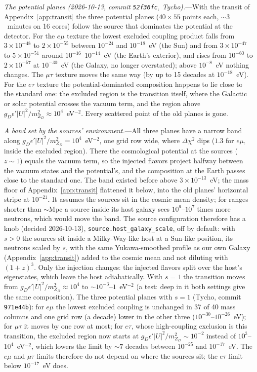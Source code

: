 \documentclass[11pt,a4paper]{article}
\newcommand{\mzd}{m_{Z_D}}
\newcommand{\gd}{g_D}
\newcommand{\epsp}{\epsilon'}
\begin{document}
\textit{The potential planes (2026-10-13, commit \texttt{52f36fc}, Tycho).}---With the transit
of Appendix~\ref{app:transit} the three potential planes ($40\times55$ points each, $\sim3$~minutes on
16 cores) follow the source that dominates the potential at the detector. For the $e\mu$ texture
the lowest excluded coupling product falls from $3\times10^{-48}$ to $2\times10^{-55}$ between
$10^{-24}$ and $10^{-18}$~eV (the Sun) and from $3\times10^{-47}$ to $5\times10^{-51}$ around
$10^{-16}$--$10^{-14}$~eV (the Earth's exterior), and rises from $10^{-60}$ to $2\times10^{-57}$ at
$10^{-30}$~eV (the Galaxy, no longer overstated); above $10^{-8}$~eV nothing changes. The $\mu\tau$
texture moves the same way (by up to 15 decades at $10^{-18}$~eV). For the $e\tau$ texture the
potential-dominated composition happens to lie close to the standard one: the excluded region is
the transition itself, where the Galactic or solar potential crosses the vacuum term, and the region
above $\gd\epsp|U|^2/\mzd^2\approx10^{4}$~eV$^{-2}$. Every scattered point of the old planes is gone.

\textit{A band set by the sources' environment.}---All three planes have a narrow band along
$\gd\epsp|U|^2/\mzd^2 = 10^4$~eV$^{-2}$, one grid row wide, where $\Delta\chi^2$ dips ($1.3$ for
$e\mu$, inside the excluded region). There the cosmological potential at the sources ($z\sim1$)
equals the vacuum term, so the injected flavors project halfway between the vacuum states and the
potential's, and the composition at the Earth passes close to the standard one. The band existed
before above $3\times10^{-13}$~eV; the mass floor of Appendix~\ref{app:transit} flattened it below,
into the old planes' horizontal stripe at $10^{-21}$. It assumes the sources sit in the cosmic mean
density; for ranges shorter than $\sim$Mpc a source inside its host galaxy sees $10^6$--$10^7$
times more neutrons, which would move the band. The source configuration therefore has a knob
(decided 2026-10-13), \texttt{source.host\_galaxy\_scale}, off by default: with $s > 0$ the sources
sit inside a Milky-Way-like host at a Sun-like position, its neutrons scaled by $s$, with the same
Yukawa-smoothed profile as our own Galaxy (Appendix~\ref{app:transit}) added to the cosmic mean
and not diluting with $(1+z)^3$. Only the injection changes: the injected flavors split over the
host's eigenstates, which leave the host adiabatically. With $s = 1$ the transition moves from
$\gd\epsp|U|^2/\mzd^2\approx10^4$ to $\sim10^{-3}$--$1$~eV$^{-2}$ (a test: deep in it both settings
give the same composition). The three potential planes with $s = 1$ (Tycho, commit
\texttt{971e44b}): for $e\mu$ the lowest excluded coupling is unchanged in 37 of 40 mass columns
and one grid row (a decade) lower in the other three ($10^{-30}$--$10^{-26}$~eV); for $\mu\tau$
it moves by one row at most; for $e\tau$, whose high-coupling exclusion is this transition, the
excluded region now starts at $\gd\epsp|U|^2/\mzd^2\sim10^{-2}$ instead of $10^{3}$--$10^4$~eV$^{-2}$,
which lowers the limit by $\sim7$ decades between $10^{-25}$ and $10^{-17}$~eV. The $e\mu$ and $\mu\tau$
limits therefore do not depend on where the sources sit; the $e\tau$ limit below $10^{-17}$~eV
does.
\end{document}
